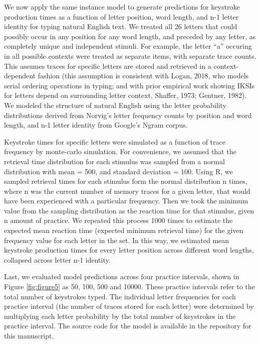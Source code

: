 \documentclass[,man,floatsintext]{apa6}
\begin{document}
We now apply the same instance model to generate predictions for keystroke production times as a function of letter position, word length, and n-1 letter identity for typing natural English text. We treated all 26 letters that could possibly occur in any position for any word length, and preceded by any letter, as completely unique and independent stimuli. For example, the letter \enquote{a} occuring in all possible contexts were treated as separate items, with separate trace counts. This assumes traces for specific letters are stored and retrieved in a context-dependent fashion (this assumption is consistent with Logan, 2018, who models serial ordering operations in typing; and with prior empirical work showing IKSIs for letters depend on surrounding letter context, Shaffer, 1973; Gentner, 1982). We modeled the structure of natural English using the letter probability distributions derived from Norvig's letter frequency counts by position and word length, and n-1 letter identity from Google's Ngram corpus.

Keystroke times for specific letters were simulated as a function of trace frequency by monte-carlo simulation. For convenience, we assumed that the retrieval time distribution for each stimulus was sampled from a normal distribution with mean = 500, and standard deviation = 100. Using R, we sampled retrieval times for each stimulus form the normal distribution n times, where n was the current number of memory traces for a given letter, that would have been experienced with a particular frequency. Then we took the minimum value from the sampling distribution as the reaction time for that stimulus, given n amount of practice. We repeated this process 1000 times to estimate the expected mean reaction time (expected minimum retrieval time) for the given frequency value for each letter in the set. In this way, we estimated mean keystroke production times for every letter position across different word lengths, collapsed across letter n-1 identity.

Last, we evaluated model predictions across four practice intervals, shown in Figure \ref{fig:figure5} as 50, 100, 500 and 10000. These practice intervals refer to the total number of keystrokes typed. The individual letter frequencies for each practice interval (the number of traces stored for each letter) were determined by multiplying each letter probability by the total number of keystrokes in the practice interval. The source code for the model is available in the repository for this manuscript.
\end{document}
